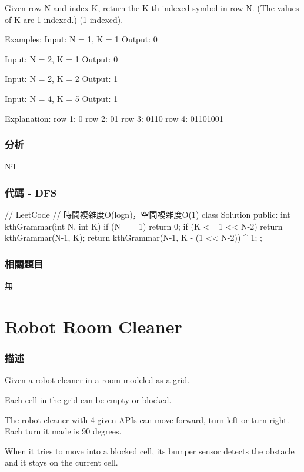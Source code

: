 Given row N and index K, return the K-th indexed symbol in row N. (The values of K are 1-indexed.) (1 indexed).

\begin{Code}
Examples:
Input: N = 1, K = 1
Output: 0

Input: N = 2, K = 1
Output: 0

Input: N = 2, K = 2
Output: 1

Input: N = 4, K = 5
Output: 1

Explanation:
row 1: 0
row 2: 01
row 3: 0110
row 4: 01101001
\end{Code}

\subsubsection{分析}
Nil

\subsubsection{代碼 - DFS}
\begin{Code}
// LeetCode
// 時間複雜度O(logn)，空間複雜度O(1)
class Solution {
public:
    int kthGrammar(int N, int K) {
        if (N == 1) return 0;
        if (K <= 1 << N-2)
            return kthGrammar(N-1, K);
        return kthGrammar(N-1, K - (1 << N-2)) ^ 1;
    }
};
\end{Code}

\subsubsection{相關題目}
\begindot
\item 無
\myenddot

\section{Robot Room Cleaner}
\label{sec:robot-room-cleaner}

\subsubsection{描述}
Given a robot cleaner in a room modeled as a grid.

Each cell in the grid can be empty or blocked.

The robot cleaner with 4 given APIs can move forward, turn left or turn right. Each turn it made is 90 degrees.

When it tries to move into a blocked cell, its bumper sensor detects the obstacle and it stays on the current cell.

